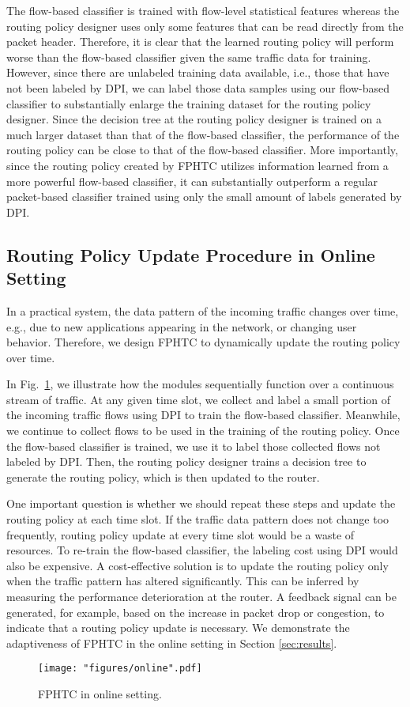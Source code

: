 The flow-based classifier is trained with flow-level statistical features whereas the routing policy designer uses only some features that can be read directly from the packet header. Therefore, it is clear that the learned routing policy will perform worse than the flow-based classifier given the same traffic data for training. However, since there are unlabeled training data available, i.e., those that have not been labeled by DPI, we can label those data samples using our flow-based classifier to substantially enlarge the training dataset for the routing policy designer. Since the decision tree at the routing policy designer is trained on a much larger dataset than that of the flow-based classifier, the performance of the routing policy can be close to that of the flow-based classifier. More importantly, since the routing policy created by FPHTC utilizes information learned from a more powerful flow-based classifier, it can substantially outperform a regular packet-based classifier trained using only the small amount of labels generated by DPI.


\subsection{Routing Policy Update Procedure in Online Setting}

In a practical system, the data pattern of the incoming traffic changes over time, e.g., due to new applications appearing in the network, or changing user behavior. Therefore, we design FPHTC to dynamically update the routing policy over time.

In Fig.~\ref{fig:online}, we illustrate how the modules sequentially function over a continuous stream of traffic. At any given time slot, we collect and label a small portion of the incoming traffic flows using DPI to train the flow-based classifier. Meanwhile, we continue to collect flows to be used in the training of the routing policy. Once the flow-based classifier is trained, we use it to label those collected flows not labeled by DPI. Then, the routing policy designer trains a decision tree to generate the routing policy, which is then updated to the router. 

One important question is whether we should repeat these steps and update the routing policy at each time slot. If the traffic data pattern does not change too frequently, routing policy update at every time slot would be a waste of resources. To re-train the flow-based classifier, the labeling cost using DPI would also be expensive. A cost-effective solution is to update the routing policy only when the traffic pattern has altered significantly. This can be inferred by measuring the performance deterioration at the router. A feedback signal can be generated, for example, based on the increase in packet drop or congestion, to indicate that a routing policy update is necessary. We demonstrate the adaptiveness of FPHTC in the online setting in Section \ref{sec:results}.

\begin{figure}[t]
	\centering
	\texttt{[image: "figures/online".pdf]}
	\caption{FPHTC in online setting.}
	\label{fig:online}
\end{figure}